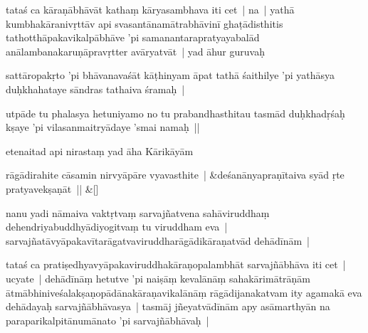 \documentclass[article,12pt,a4paper]{memoir}%
\newcounter{parCount}
\begin{document}
	  
	  \pstart \leavevmode%
	\label{thakur75-27.3}tataś ca kāraṇābhāvāt kathaṃ kāryasambhava iti cet | na | yathā kumbhakāranivṛttāv api svasantānamātrabhāvinī ghaṭādisthitis tathotthāpakavikalpābhāve 'pi samanantarapratyayabalād anālambanakaruṇāpravṛtter avāryatvāt | yad āhur guruvaḥ 
	{}
	\pend%
      

	  
	  \pstart \leavevmode%
	sattāropakṛto 'pi bhāvanavaśāt kāṭhinyam āpat tathā śaithilye 'pi yathāsya duḥkhahataye sāndras tathaiva śramaḥ | 
	{}
	\pend%
      

	  
	  \pstart \leavevmode%
	utpāde tu phalasya hetuniyamo no tu prabandhasthitau tasmād duḥkhadṛśaḥ kṣaye 'pi vilasanmaitryādaye 'smai namaḥ || 
	{}
	\pend%
      

	  
	  \pstart \leavevmode%
	etenaitad api nirastaṃ yad āha Kārikāyām 
	{}
	\pend%
      
	    
	    \stanza[\smallbreak]
	  rāgādirahite cāsamin nirvyāpāre vyavasthite | &deśanānyapraṇītaiva syād ṛte pratyavekṣaṇāt || \&[\smallbreak]
	  
	  
	  

	  
	  \pstart \leavevmode%
	\label{thakur75-27.13}nanu yadi nāmaiva vaktṛtvaṃ sarvajñatvena sahāviruddhaṃ dehendriyabuddhyādiyogitvaṃ tu viruddham eva | sarvajñatāvyāpakavītarāgatvaviruddharāgādikāraṇatvād dehādīnām | 
	{}
	\pend%
      

	  
	  \pstart \leavevmode%
	\label{thakur75-27.15}tataś ca pratiṣedhyavyāpakaviruddhakāraṇopalambhāt sarvajñābhāva iti cet | ucyate | dehādīnāṃ hetutve 'pi naiṣāṃ kevalānāṃ sahakārimātrāṇām ātmābhiniveśalakṣaṇopādānakāraṇavikalānāṃ rāgādijanakatvam ity agamakā eva dehādayaḥ sarvajñābhāvasya | tasmāj jñeyatvādīnām apy asāmarthyān na paraparikalpitānumānato 'pi sarvajñābhāvaḥ | 
	{}
	\pend%
      
\end{document}
